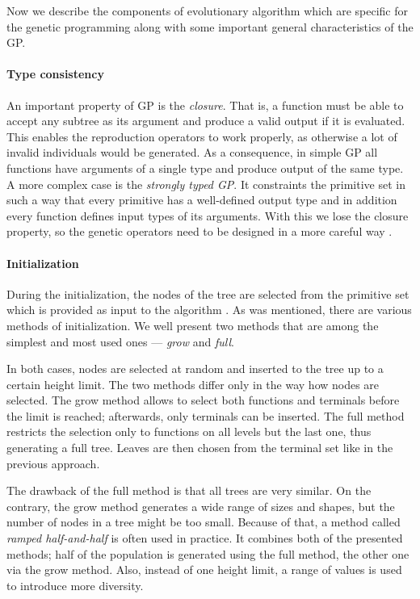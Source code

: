 Now we describe the components of evolutionary algorithm which are specific
for the genetic programming along with some important general characteristics
of the GP.

\paragraph{Type consistency}
An important property of GP is the \emph{closure}. That is, a function must
be able to accept any subtree as its argument and produce a valid output if
it is evaluated. This enables the reproduction operators to work properly, as
otherwise a lot of invalid individuals would be generated. As a consequence,
in simple GP all functions have arguments of a single type and produce output
of the same type. A more complex case is the \emph{strongly typed GP}. It
constraints the primitive set in such a way that every primitive has a
well-defined output type and in addition every function defines input types of
its arguments. With this we lose the closure property, so the genetic operators
need to be designed in a more careful way \citep[p.~21]{Poli:2008:FGG:1796422}.

\paragraph{Initialization} \label{sec:gp:init}
During the initialization, the nodes of the tree are selected from the
primitive set which is provided as input to the algorithm
\citep{Koza:1992:GPP:138936}. As was mentioned, there are various methods of 
initialization. We well present two methods that are among the simplest and 
most used ones --- \emph{grow} and \emph{full}.

In both cases, nodes are selected at random and inserted to the tree up to a
certain height limit. The two methods differ only in the way how nodes are
selected. The grow method allows to select both functions and terminals
before the limit is reached; afterwards, only terminals can be inserted. The
full method restricts the selection only to functions on all levels but the
last one, thus generating a full tree. Leaves are then chosen from the terminal
set like in the previous approach.

The drawback of the full method is that all trees are very similar. On the
contrary, the grow method generates a wide range of sizes and shapes, but the
number of nodes in a tree might be too small. Because of that, a method called
\emph{ramped half-and-half} is often used in practice. It combines both 
of the presented methods; half of the population is generated using the full
method, the other one via the grow method. Also, instead of one height limit, a
range of values is used to introduce more diversity.
\citep{Poli:2008:FGG:1796422}

